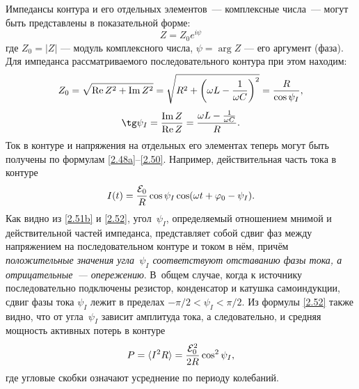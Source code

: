 Импедансы контура и его отдельных элементов~--- комплексные числа~--- могут быть
представлены в показательной форме:
\begin{equation}
Z = Z_0 e^{i\psi}
\end{equation}
где $Z_0 = |Z|$ --- модуль комплексного числа, 
$\psi = \arg Z$ --- его аргумент (фаза).
Для импеданса рассматриваемого
последовательного контура при этом находим:
		\begin{equation}
			\eqmark{2.51a}
    Z_0=\sqrt{\Re Z^2 + \Im Z^2}=\sqrt{R^2+\left(\omega L-\frac{1}{\omega C}\right)^2}=\frac{R}{\cos\psi_I},
		\end{equation}
		\begin{equation}
			\eqmark{2.51b}
	\tg\psi_I=\frac{\Im Z}{\Re Z}=\frac{\omega L-\frac{1}{\omega C}}{R}.
		\end{equation}
Ток в контуре и напряжения на отдельных его элементах теперь
могут быть получены по формулам \eqref{2.48a}--\eqref{2.50}. Например,
действительная часть тока в контуре
\begin{equation}
	\eqmark{2.52}
	I(t)=\frac{\mathcal{E}_0}{R}\cos\psi_I\cos(\omega t+\varphi_0-\psi_I).
\end{equation}
Как видно из \eqref{2.51b} и \eqref{2.52}, угол~$\psi_I$, определяемый отношением мнимой и
действительной частей импеданса, представляет собой сдвиг фаз между напряжением
на последовательном контуре и током в нём, причём \emph{положительные
значения угла~$\psi_I$ соответствуют отставанию фазы тока, а
отрицательные~--- опережению}. В~общем случае, когда к источнику последовательно
подключены резистор, конденсатор и катушка самоиндукции, сдвиг фазы тока
$\psi_I$ лежит в пределах $-\pi/2<\psi_I<\pi/2$. Из формулы \eqref{2.52} также
видно, что от угла~$\psi_I$ зависит амплитуда тока, а следовательно, и средняя
мощность активных потерь в контуре
\begin{equation}\eqmark{2.53}
	P=\langle I^2R\rangle=\frac{\mathcal{E}_0^2}{2R}\cos^2\psi_I,
\end{equation}
где угловые скобки означают усреднение по периоду колебаний.


\label{sec:vectordia}

